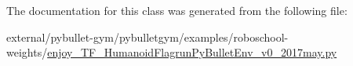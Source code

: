 The documentation for this class was generated from the following file\+:\begin{DoxyCompactItemize}
\item 
external/pybullet-\/gym/pybulletgym/examples/roboschool-\/weights/\hyperlink{enjoy___t_f___humanoid_flagrun_py_bullet_env__v0__2017may_8py}{enjoy\+\_\+\+T\+F\+\_\+\+Humanoid\+Flagrun\+Py\+Bullet\+Env\+\_\+v0\+\_\+2017may.\+py}\end{DoxyCompactItemize}
